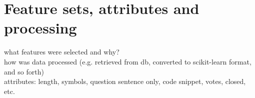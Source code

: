 \begin{comment}
		11. Stemming of data, model creation and gridsearch with SGD			
		12. Model based on 20,000 samples (10k good, 10k bad) - took approx ~3hours for both models
			Model 1 was for all data (no test set). Model 2 was based on train\_test\_split
		13. Added tags column to the used dataset. Added the unprocessed dataset (but html is removed)
		14. Tested out different SVM algorithms (SVC, SGD and LinearSVC)
			Issue was that I managed to overwrite the .csv, so I had to do everything over again
			took approximately 24-36 hours to complete (+ 3days before hand to make everything run smoothly).
		15. Attempted to use optparse, argparse to make it executable. 
			Problem is that it exits after command is run. Need it to continue running to be able to:
				a) create new (or load existing) model
				b) use model from a) to predict quality of entered question (rinse/repeat)
		16. Used while loop instead (loop until exit entered). shortcuts are the same as with argparse, but 
			without the '-' in front (e.g. instead of -e, just press 'e' to exit)
			
		Additional Notes (which might be relevant for the next section):
		
			- issues with setting up environment, installations, etc
			- switching from "good"/"bad" to +/-1 for class label (bcz libsvm)
			- switching from -10/+50 to -5/+50 to get more separation (and more results for bad)
			
		Potentially useful links:
		
		http://billchambers.me/tutorials/2015/01/14/python-nlp-cheatsheet-nltk-scikit-learn.html
		http://stackoverflow.com/questions/28064634/random-state-pseudo-random-numberin-scikit-learn
		http://stackoverflow.com/questions/35382657/my-pipeline-configuration-for-text-classification-using-
		sklearn-in-python
\end{comment}

\section{Feature sets, attributes and processing}
\label{sec:feature_sets}
what features were selected and why? \\
how was data processed (e.g. retrieved from db, converted to scikit-learn format, and so forth) \\
attributes: length, symbols, question sentence only, code snippet, votes, closed, etc.

